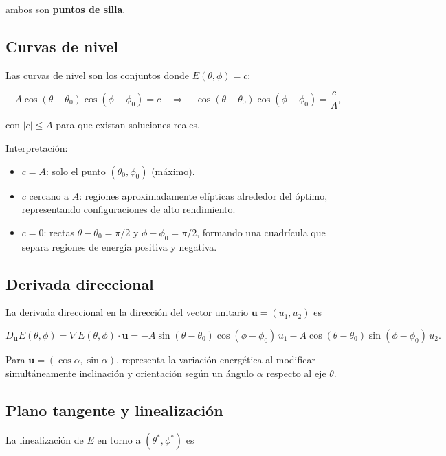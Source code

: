 \documentclass[12pt,a4paper]{article}
\begin{document}
ambos son \textbf{puntos de silla}.

\subsection{Curvas de nivel}

Las curvas de nivel son los conjuntos donde $E(\theta,\phi)=c$:

\begin{equation}\label{eq:curvas}
A\cos(\theta-\theta_0)\cos(\phi-\phi_0)=c
\quad\Longrightarrow\quad
\cos(\theta-\theta_0)\cos(\phi-\phi_0)=\frac{c}{A},
\end{equation}

con $|c|\leq A$ para que existan soluciones reales.

Interpretación:
\begin{itemize}
    \item $c=A$: solo el punto $(\theta_0,\phi_0)$ (máximo).
    \item $c$ cercano a $A$: regiones aproximadamente elípticas alrededor del óptimo, representando configuraciones de alto rendimiento.
    \item $c=0$: rectas $\theta-\theta_0=\pi/2$ y $\phi-\phi_0=\pi/2$, formando una cuadrícula que separa regiones de energía positiva y negativa.
\end{itemize}

\subsection{Derivada direccional}

La derivada direccional en la dirección del vector unitario $\mathbf{u}=(u_1,u_2)$ es

\begin{equation}\label{eq:dd}
D_{\mathbf{u}}E(\theta,\phi) = \nabla E(\theta,\phi)\cdot\mathbf{u}
= -A\sin(\theta-\theta_0)\cos(\phi-\phi_0)\,u_1
  -A\cos(\theta-\theta_0)\sin(\phi-\phi_0)\,u_2.
\end{equation}

Para $\mathbf{u}=(\cos\alpha,\sin\alpha)$, representa la variación energética al modificar simultáneamente inclinación y orientación según un ángulo $\alpha$ respecto al eje $\theta$.

\subsection{Plano tangente y linealización}

La linealización de $E$ en torno a $(\theta^*,\phi^*)$ es
\end{document}

